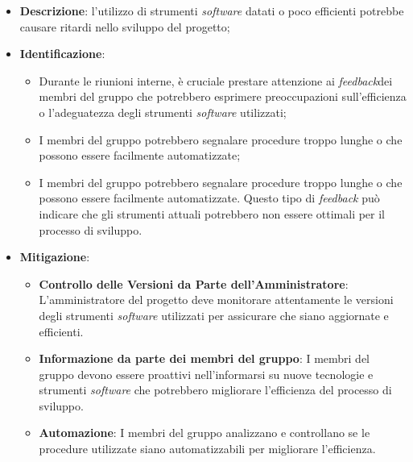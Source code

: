 \label{risk:strumenti software inadeguati}
\begin{itemize}
	\item \textbf{Descrizione}: l'utilizzo di strumenti \textit{software} datati o poco
	      efficienti potrebbe causare ritardi nello sviluppo del progetto;

	\item \textbf{Identificazione}:
	      \begin{itemize}
		      \item Durante le riunioni interne, è cruciale prestare attenzione
		            ai \textit{feedback}\g dei membri del gruppo che potrebbero esprimere
		            preoccupazioni sull'efficienza o l'adeguatezza degli strumenti \textit{software} utilizzati;

		      \item I membri del gruppo potrebbero segnalare procedure troppo lunghe o
		            che possono essere facilmente automatizzate;

		      \item I membri del gruppo potrebbero segnalare procedure troppo lunghe o
		            che possono essere facilmente automatizzate.
		            Questo tipo di \textit{feedback} può indicare che gli strumenti attuali
		            potrebbero non essere ottimali per il processo di sviluppo.
	      \end{itemize}

	\item \textbf{Mitigazione}:
	      \begin{itemize}
		      \item \textbf{Controllo delle Versioni da Parte dell'Amministratore}:
		            L'amministratore del progetto deve monitorare attentamente le versioni
		            degli strumenti \textit{software} utilizzati per assicurare che siano aggiornate e efficienti.

		      \item \textbf{Informazione da parte dei membri del gruppo}:
		            I membri del gruppo devono essere proattivi nell'informarsi su nuove tecnologie e
		            strumenti \textit{software} che potrebbero migliorare l'efficienza del processo di sviluppo.

		      \item \textbf{Automazione}:
		            I membri del gruppo analizzano e controllano se le procedure utilizzate siano
		            automatizzabili per migliorare l'efficienza.
	      \end{itemize}
\end{itemize}
